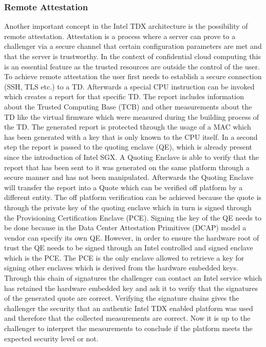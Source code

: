 \documentclass[sigplan,screen,nonacm]{acmart}
\begin{document}
\subsubsection{Remote Attestation}

Another important concept in the Intel TDX architecture is the possibility of remote attestation.
Attestation is a process where a server can prove to a challenger via a secure channel that certain configuration parameters are met and that the server is trustworthy.
In the context of confidential cloud computing this is an essential feature as the trusted resources are outside the control of the user.
To achieve remote attestation the user first needs to establish a secure connection (SSH, TLS etc.) to a TD.
Afterwards a special CPU instruction can be invoked which creates a report for that specific TD.
The report includes information about the Trusted Computing Base (TCB) and other measurements about the TD like the virtual firmware which were measured during the building process of the TD.
The generated report is protected through the usage of a MAC which has been generated with a key that is only known to the CPU itself.
In a second step the report is passed to the quoting enclave (QE), which is already present since the introduction of Intel SGX.
A Quoting Enclave is able to verify that the report that has been sent to it was generated on the same platform through a secure manner and has not been manipulated.
Afterwards the Quoting Enclave will transfer the report into a Quote which can be verified off platform by a different entity.
The off platform verification can be achieved because the quote is through the private key of the quoting enclave which in turn is signed through the Provisioning Certification Enclave (PCE).
Signing the key of the QE needs to be done because in the Data Center Attestation Primitives (DCAP) model a vendor can specify its own QE.
However, in order to ensure the hardware root of trust the QE needs to be signed through an Intel controlled and signed enclave which is the PCE.
The PCE is the only enclave allowed to retrieve a key for signing other enclaves which is derived from the hardware embedded keys\cite{Intel-QVL}.
Through this chain of signatures the challenger can contact an Intel service which has retained the hardware embedded key and ask it to verify that the signatures of the generated quote are correct.
Verifying the signature chains gives the challenger the security that an authentic Intel TDX enabled platform was used and therefore that the collected measurements are correct.
Now it is up to the challenger to interpret the measurements to conclude if the platform meets the expected security level or not.
\end{document}
